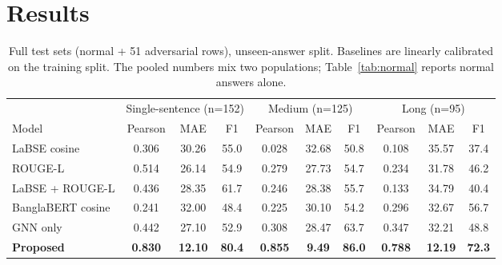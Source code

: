 \documentclass[10pt,a4paper,twocolumn]{article}
\newcommand{\best}[1]{\textbf{#1}}
\begin{document}
\section{Results}

\begin{table}[t]
\centering\small
\begin{tabular}{lccc|ccc|ccc}
\toprule
 & \multicolumn{3}{c|}{Single-sentence (n=152)} & \multicolumn{3}{c|}{Medium (n=125)} & \multicolumn{3}{c}{Long (n=95)} \\
Model & Pearson & MAE & F1 & Pearson & MAE & F1 & Pearson & MAE & F1 \\
\midrule
LaBSE cosine & 0.306 & 30.26 & 55.0 & 0.028 & 32.68 & 50.8 & 0.108 & 35.57 & 37.4 \\
ROUGE-L & 0.514 & 26.14 & 54.9 & 0.279 & 27.73 & 54.7 & 0.234 & 31.78 & 46.2 \\
LaBSE + ROUGE-L & 0.436 & 28.35 & 61.7 & 0.246 & 28.38 & 55.7 & 0.133 & 34.79 & 40.4 \\
BanglaBERT cosine & 0.241 & 32.00 & 48.4 & 0.225 & 30.10 & 54.2 & 0.296 & 32.67 & 56.7 \\
GNN only & 0.442 & 27.10 & 52.9 & 0.308 & 28.47 & 63.7 & 0.347 & 32.21 & 48.8 \\
\textbf{Proposed} & \best{0.830} & \best{12.10} & \best{80.4} & \best{0.855} & \best{9.49} & \best{86.0} & \best{0.788} & \best{12.19} & \best{72.3} \\
\bottomrule
\end{tabular}
\caption{Full test sets (normal + 51 adversarial rows), unseen-answer split. Baselines are linearly calibrated on the training split. The pooled numbers mix two populations; Table~\ref{tab:normal} reports normal answers alone.}
\label{tab:full}
\end{table}

\begin{table}[t]
\centering\small
{}
\caption{Normal (non-adversarial) test answers, unseen-answer split, with paired-bootstrap 95\% confidence intervals against the best baseline, and five-fold grouped cross-validation.}
\label{tab:normal}
\end{table}
\end{document}
